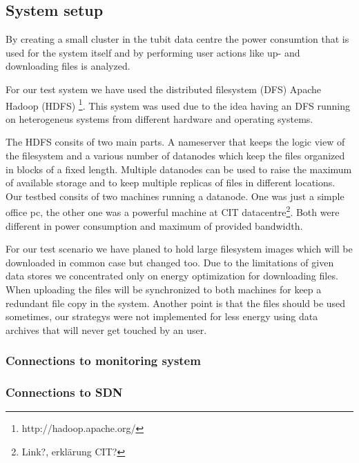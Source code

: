 
\subsection{System setup}

By creating a small cluster in the tubit data centre the power consumtion that is used for the system itself and by performing user actions like up- and downloading files is analyzed.

For our test system we have used the distributed filesystem (DFS) Apache Hadoop\textsuperscript{\textregistered} (HDFS) \footnote{http://hadoop.apache.org/}. This system was used due to the idea having an DFS running on heterogeneus systems from different hardware and operating systems. 

The HDFS consits of two main parts. A nameserver that keeps the logic view of the filesystem and a various number of datanodes which keep the files organized in blocks of a fixed length. Multiple datanodes can be used to raise the maximum of available storage and to keep multiple replicas of files in different locations. Our testbed consits of two machines running a datanode. One was just a simple office pc, the other one was a powerful machine at CIT datacentre\footnote{Link?, erklärung CIT?}. Both were different in power consumption and maximum of provided bandwidth. 


For our test scenario we have planed to hold large filesystem images which will be downloaded in common case but changed too. Due to the limitations of given data stores we concentrated only on energy optimization for downloading files. When uploading the files will be synchronized to both machines for keep a redundant file copy in the system.
Another point is that the files should be used sometimes, our strategys were not implemented for less energy using data archives that will never get touched by an user.

\subsubsection{Connections to monitoring system}

\subsubsection{Connections to SDN}


